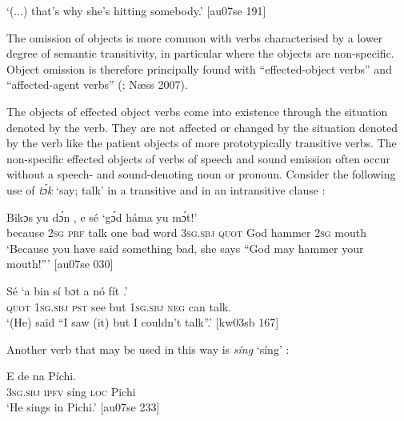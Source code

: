 \glt ‘(...) that’s why she’s hitting somebody.’ [au07se 191]
\z

The omission of objects is more common with verbs characterised by a lower degree of semantic transitivity, in particular where the objects are non-specific. Object omission is therefore principally found with “effected-object verbs\index{}” \citep{Hopper1985} and “affected-agent verbs\index{}” (\citealt{Tenny1994}; Næss 2007).


The objects of effected object verbs come into existence through the situation denoted by the verb. They are not affected or changed by the situation denoted by the verb like the patient objects of more prototypically transitive verbs. The non-specific effected objects of verbs of speech and sound emission often occur without a speech- and sound-denoting noun or pronoun. Consider the following use of \textit{tɔ́k} ‘say; talk’ in a transitive  and in an intransitive clause : 



\ea%
    \label{ex:key:1277}
    \gll Bikɔs  yu  dɔ́n        ,    e    sé
‘gɔ́d    háma  yu  mɔ́t!’\\
because  \textsc{2sg}  \textsc{prf}  talk  one    bad  word  \textsc{3sg.sbj}  \textsc{quot}
God    hammer  \textsc{2sg}  mouth\\

\glt ‘Because you have said something bad, she says 
“God may hammer your mouth!”’ [au07se 030]
\z


\ea%
    \label{ex:key:1278}
    \gll Sé    ‘a    bin  sí  bɔt  a    nó  fít  .’\\
\textsc{quot}    \textsc{1sg.sbj}  \textsc{pst}  see  but  \textsc{1sg.sbj}  \textsc{neg}  can  talk.\\

\glt ‘(He) said “I saw (it) but I couldn’t talk”.’ [kw03sb 167]
\z

Another verb that may be used in this way is \textit{síng} ‘síng’ :


\ea%
    \label{ex:key:1279}
    \gll E    de      na  Píchi.\\
\textsc{3sg.sbj}  \textsc{ipfv}  síng    \textsc{loc}  Pichi\\

\glt ‘He sings in Pichi.’ [au07se 233]
\z

